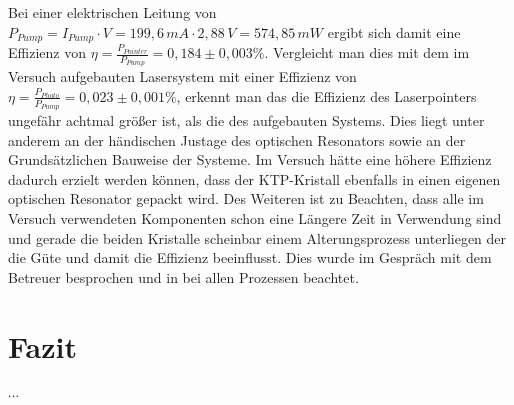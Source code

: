 \documentclass[twoside,colorback,accentcolor=tud4c,11pt]{tudreport}
\begin{document}
Bei einer elektrischen Leitung von $P_{Pump}=I_{Pump}\cdot V=199,6\,\si{mA}\cdot 2,88\,\si{V}=574,85\,\si{mW}$ ergibt sich damit eine Effizienz von $\eta=\frac{P_{Pointer}}{P_{Pump}}=0,184\pm 0,003 \%$. Vergleicht man dies mit dem im Versuch aufgebauten Lasersystem mit einer Effizienz von $\eta=\frac{P_{Photo}}{P_{Pump}}=0,023\pm0,001 \%$, erkennt man das die Effizienz des Laserpointers ungefähr achtmal größer ist, als die des aufgebauten Systems. Dies liegt unter anderem an der händischen Justage des optischen Resonators sowie an der Grundsätzlichen Bauweise der Systeme. Im Versuch hätte eine höhere Effizienz dadurch erzielt werden können, dass der KTP-Kristall ebenfalls in einen eigenen optischen Resonator gepackt wird. Des Weiteren ist zu Beachten, dass alle im Versuch verwendeten Komponenten schon eine Längere Zeit in Verwendung sind und gerade die beiden Kristalle scheinbar einem Alterungsprozess unterliegen der die Güte und damit die Effizienz beeinflusst. Dies wurde im Gespräch mit dem Betreuer besprochen und in bei allen Prozessen beachtet.

\chapter{Fazit}
$\cdots$
\end{document}
